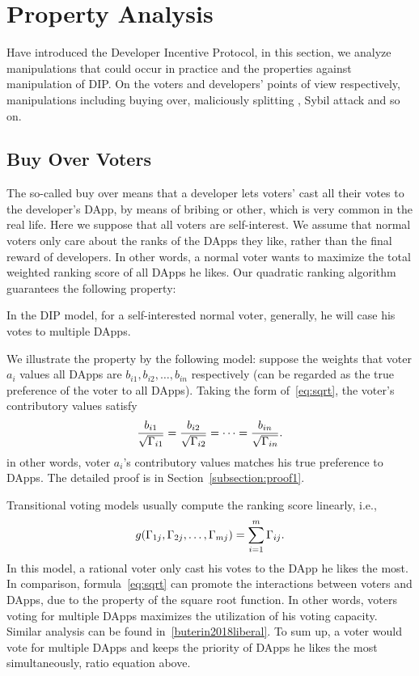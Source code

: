 \section{Property Analysis}
\label{section:properties}
Have introduced the Developer Incentive Protocol, in this section, we analyze
manipulations that could occur in practice and the properties against
manipulation of  DIP\@. On the voters and developers' points of view respectively, manipulations including buying over, maliciously splitting \dapp, Sybil attack and so on.
\subsection{Buy Over Voters}
The so-called buy over means that a developer lets voters' cast all their votes to the developer's DApp, by  means of bribing or other, which is very common in the real life. Here we suppose that all voters are self-interest. We assume that normal voters only care about the ranks of the DApps they like, rather than the final reward of developers. In other words, a normal voter wants to maximize the total
weighted ranking score of all DApps he likes. Our quadratic ranking algorithm guarantees the following property:
\begin{property}
	\label{p1}
	In the DIP model, for a self-interested normal voter, generally, he will case his votes to multiple DApps.
\end{property}
We illustrate the property by the following model: suppose the weights that
voter $a_i$ values all DApps are $b_{i1}, b_{i2}, \ldots, b_{in}$ respectively (can be regarded as the true preference of the voter to all DApps). Taking the form of~\ref{eq:sqrt}, the voter's contributory values satisfy
$$\frac{b_{i1}}{\sqrt{\Gamma_{i1}}}=\frac{b_{i2}}{\sqrt{\Gamma_{i2}}}=\cdots=\frac{b_{in}}{\sqrt{\Gamma_{in}}}.$$
in other words, voter $a_i$'s contributory values matches his true preference to DApps. The detailed proof is in Section~\ref{subsection:proof1}.

Transitional voting models usually compute the ranking score linearly, i.e.,
$$g(\Gamma_{1j},\Gamma_{2j},\ldots,\Gamma_{mj}) = \sum_{i=1}^m \Gamma_{ij}.$$
In this model, a rational voter only cast his votes to the DApp he likes the
most. In comparison, formula~\ref{eq:sqrt} can promote the interactions between
voters and DApps, due to the property of the square root function. In other
words, voters voting for multiple DApps maximizes the utilization of his voting
capacity. Similar analysis can be found in~\ref{buterin2018liberal}. To sum up,
a voter would vote for multiple DApps and keeps the priority of DApps he likes
the most simultaneously, \ie ratio equation above.

